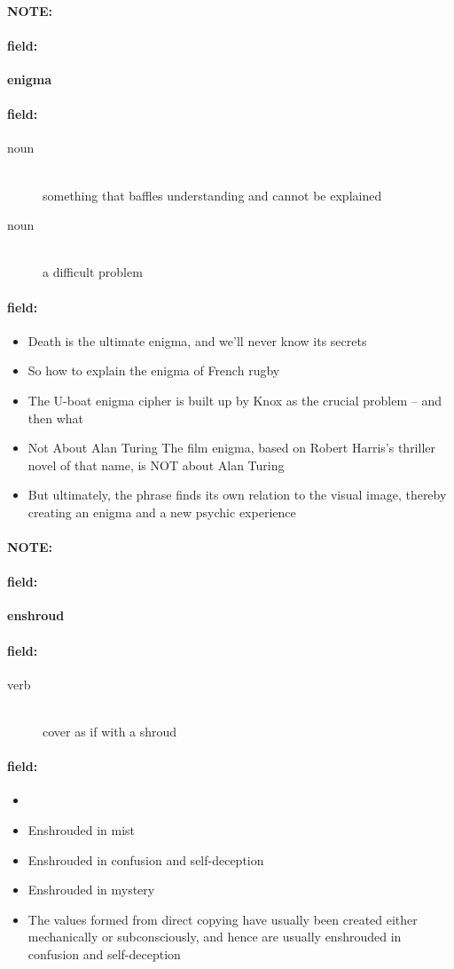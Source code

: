 \documentclass[12pt]{article}
\newenvironment{note}{\paragraph{NOTE:}}{}
\newenvironment{field}{\paragraph{field:}}{}
\begin{document}
\begin{note}
\begin{field}
\textbf{\large enigma}
\end{field}


\begin{field}
\begin{description}
\item[noun] \hfill \\ 
something that baffles understanding and cannot be explained

\item[noun] \hfill \\ 
a difficult problem

\end{description}
\end{field}

\begin{field}
\begin{itemize}
\item Death is the ultimate enigma, and we'll never know its secrets
\item So how to explain the enigma of French rugby
\item The U-boat enigma cipher is built up by Knox as the crucial problem -- and then what
\item Not About Alan Turing The film enigma, based on Robert Harris's thriller novel of that name, is NOT about Alan Turing
\item But ultimately, the phrase finds its own relation to the visual image, thereby creating an enigma and a new psychic experience
\end{itemize}
\end{field}
\end{note}
\begin{note}
\begin{field}
\textbf{\large enshroud}
\end{field}


\begin{field}
\begin{description}
\item[verb] \hfill \\ 
cover as if with a shroud

\end{description}
\end{field}

\begin{field}
\begin{itemize}
\item 
\item Enshrouded in mist
\item Enshrouded in confusion and self-deception
\item Enshrouded in mystery
\item The values formed from direct copying have usually been created either mechanically or subconsciously, and hence are usually enshrouded in confusion and self-deception
\end{itemize}
\end{field}
\end{note}
\end{document}
